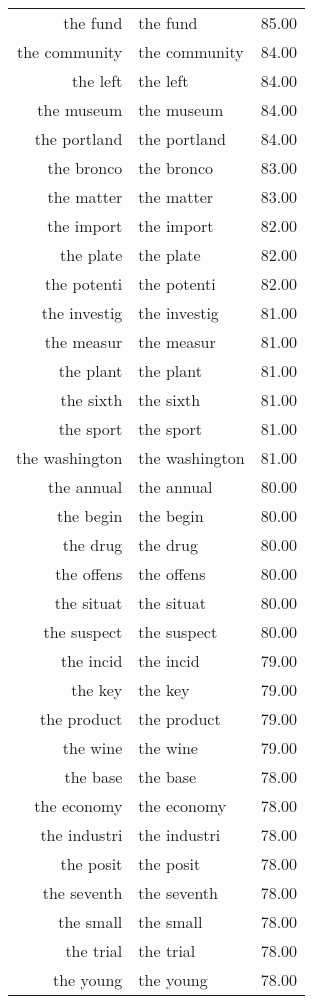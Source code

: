 \begin{table}[ht]
\begin{tabular}{rlr}
  the fund & the fund & 85.00 \\ 
  the community & the community & 84.00 \\ 
  the left & the left & 84.00 \\ 
  the museum & the museum & 84.00 \\ 
  the portland & the portland & 84.00 \\ 
  the bronco & the bronco & 83.00 \\ 
  the matter & the matter & 83.00 \\ 
  the import & the import & 82.00 \\ 
  the plate & the plate & 82.00 \\ 
  the potenti & the potenti & 82.00 \\ 
  the investig & the investig & 81.00 \\ 
  the measur & the measur & 81.00 \\ 
  the plant & the plant & 81.00 \\ 
  the sixth & the sixth & 81.00 \\ 
  the sport & the sport & 81.00 \\ 
  the washington & the washington & 81.00 \\ 
  the annual & the annual & 80.00 \\ 
  the begin & the begin & 80.00 \\ 
  the drug & the drug & 80.00 \\ 
  the offens & the offens & 80.00 \\ 
  the situat & the situat & 80.00 \\ 
  the suspect & the suspect & 80.00 \\ 
  the incid & the incid & 79.00 \\ 
  the key & the key & 79.00 \\ 
  the product & the product & 79.00 \\ 
  the wine & the wine & 79.00 \\ 
  the base & the base & 78.00 \\ 
  the economy & the economy & 78.00 \\ 
  the industri & the industri & 78.00 \\ 
  the posit & the posit & 78.00 \\ 
  the seventh & the seventh & 78.00 \\ 
  the small & the small & 78.00 \\ 
  the trial & the trial & 78.00 \\ 
  the young & the young & 78.00 \\ 

\end{tabular}
\end{table}
